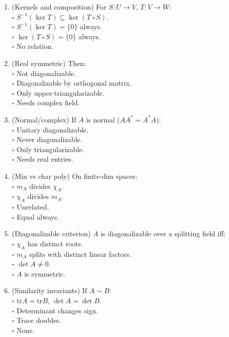 \documentclass[11pt]{article}
\theoremstyle{upright}
\begin{document}
\begin{enumerate}
\item (Kernels and composition) For $S:U\to V$, $T:V\to W$:\\
\(\square\) $S^{-1}(\ker T)\subseteq \ker(T\circ S)$.\\
\(\square\) $S^{-1}(\ker T)=\{0\}$ always.\\
\(\square\) $\ker(T\circ S)=\{0\}$ always.\\
\(\square\) No relation.

\item (Real symmetric) Then:\\
\(\square\) Not diagonalizable.\\
\(\square\) Diagonalizable by orthogonal matrix.\\
\(\square\) Only upper-triangularizable.\\
\(\square\) Needs complex field.

\item (Normal/complex) If $A$ is normal ($AA^*=A^*A$):\\
\(\square\) Unitary diagonalizable.\\
\(\square\) Never diagonalizable.\\
\(\square\) Only triangularizable.\\
\(\square\) Needs real entries.

\item (Min vs char poly) On finite-dim spaces:\\
\(\square\) $m_A$ divides $\chi_A$.\\
\(\square\) $\chi_A$ divides $m_A$.\\
\(\square\) Unrelated.\\
\(\square\) Equal always.

\item (Diagonalizable criterion) $A$ is diagonalizable over a splitting field iff:\\
\(\square\) $\chi_A$ has distinct roots.\\
\(\square\) $m_A$ splits with distinct linear factors.\\
\(\square\) $\det A\neq 0$.\\
\(\square\) $A$ is symmetric.

\item (Similarity invariants) If $A\sim B$:\\
\(\square\) $\mathrm{tr}A=\mathrm{tr}B$, $\det A=\det B$.\\
\(\square\) Determinant changes sign.\\
\(\square\) Trace doubles.\\
\(\square\) None.


\end{enumerate}
\end{document}
